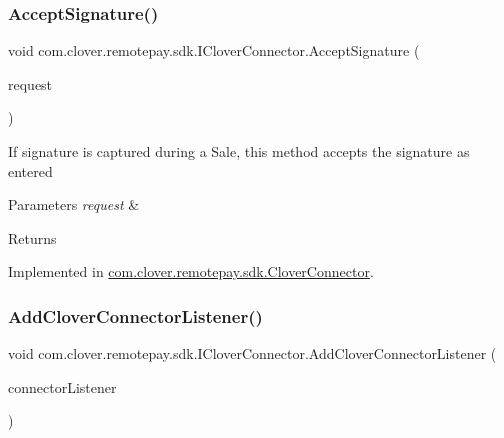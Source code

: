 \subsubsection{\texorpdfstring{Accept\+Signature()}{AcceptSignature()}}
{\footnotesize\ttfamily void com.\+clover.\+remotepay.\+sdk.\+I\+Clover\+Connector.\+Accept\+Signature (\begin{DoxyParamCaption}\item[{\hyperlink{classcom_1_1clover_1_1remotepay_1_1sdk_1_1_verify_signature_request}{Verify\+Signature\+Request}}]{request }\end{DoxyParamCaption})}



If signature is captured during a Sale, this method accepts the signature as entered 


\begin{DoxyParams}{Parameters}
{\em request} & \\
\hline
\end{DoxyParams}
\begin{DoxyReturn}{Returns}

\end{DoxyReturn}


Implemented in \hyperlink{classcom_1_1clover_1_1remotepay_1_1sdk_1_1_clover_connector_a2d54a7e1d05451c3335fe31337a56ea4}{com.\+clover.\+remotepay.\+sdk.\+Clover\+Connector}.

\mbox{\label{interfacecom_1_1clover_1_1remotepay_1_1sdk_1_1_i_clover_connector_a90fcd7781afc36d654e42b1c9daada87}} 
\subsubsection{\texorpdfstring{Add\+Clover\+Connector\+Listener()}{AddCloverConnectorListener()}}
{\footnotesize\ttfamily void com.\+clover.\+remotepay.\+sdk.\+I\+Clover\+Connector.\+Add\+Clover\+Connector\+Listener (\begin{DoxyParamCaption}\item[{\hyperlink{interfacecom_1_1clover_1_1remotepay_1_1sdk_1_1_i_clover_connector_listener}{I\+Clover\+Connector\+Listener}}]{connector\+Listener }\end{DoxyParamCaption})}



